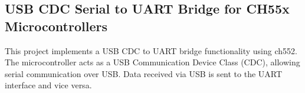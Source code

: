\documentclass[letterpaper,10pt,english]{sphinxmanual}
\begin{document}
\begin{sphinxVerbatim}[commandchars=\\\{\}]
    
   
      
        
                  
        
           
\end{sphinxVerbatim}


\subsection{USB CDC Serial to UART Bridge for CH55x Microcontrollers}
\label{\detokenize{cdc:usb-cdc-serial-to-uart-bridge-for-ch55x-microcontrollers}}
\sphinxAtStartPar
This project implements a USB CDC to UART bridge functionality using ch552. The microcontroller acts as a USB
Communication Device Class (CDC), allowing serial communication over USB. Data received via USB is sent to the
UART interface and vice versa.
\end{document}
